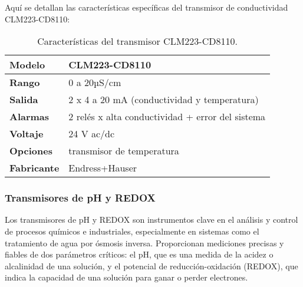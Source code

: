 Aquí se detallan las características específicas del transmisor de conductividad CLM223-CD8110:\\



\begin{table}[H]
    \centering
    \caption{Características del transmisor CLM223-CD8110.}
    \label{table:transmisor_conductividad}
    \begin{tabular}{| L{5cm} | L{5cm} |}

        \hline
        \textbf{Modelo}     & CLM223-CD8110                                    \\
        \hline
        \textbf{Rango}      & 0 a 20µS/cm                                      \\
        \hline
        \textbf{Salida}     & 2 x 4 a 20 mA (conductividad y temperatura)      \\
        \hline
        \textbf{Alarmas}    & 2 relés x alta conductividad + error del sistema \\
        \hline
        \textbf{Voltaje}    & 24 V ac/dc                                       \\
        \hline
        \textbf{Opciones}   & transmisor de temperatura                        \\
        \hline
        \textbf{Fabricante} & Endress+Hauser                                   \\
        \hline
    \end{tabular}
\end{table}



\subsubsection{Transmisores de pH y REDOX } \label{sec:transmisor_ph_redox}

Los transmisores de pH y REDOX son instrumentos clave en el análisis y control de procesos químicos e industriales, especialmente en sistemas como el tratamiento de agua por ósmosis inversa. Proporcionan mediciones precisas y fiables de dos parámetros críticos: el pH, que es una medida de la acidez o alcalinidad de una solución, y el potencial de reducción-oxidación (REDOX), que indica la capacidad de una solución para ganar o perder electrones.

